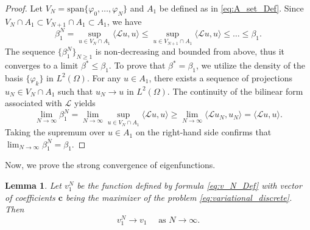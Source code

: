 \documentclass[12pt, a4paper]{article}
\theoremstyle{break}
\theoremstyle{break}
\theoremstyle{break}
\theoremstyle{break}
\theoremstyle{break}
\newtheorem{lem}{Lemma}[section]
\theoremstyle{break}
\theoremstyle{break}
\theoremstyle{break}
\theoremstyle{break}
\begin{document}
\begin{proof}
    Let $V_N = \text{span}\{\varphi_0, \ldots, \varphi_N\}$ and $A_1$ be defined as in \eqref{eq:A_set_Def}. Since $V_N \cap A_1 \subset V_{N+1} \cap A_1 \subset A_1$, we have
    \begin{equation}
        \beta_1^N = \sup_{u \in V_N \cap A_1} \langle \mathcal{L} u, u \rangle \leq \sup_{u \in V_{N+1} \cap A_1} \langle \mathcal{L} u, u \rangle \leq \ldots \leq \beta_1.
    \end{equation}
    The sequence $\{\beta_1^N\}_{N \geq 1}$ is non-decreasing and bounded from above, thus it converges to a limit $\beta^* \leq \beta_1$. To prove that $\beta^* = \beta_1$, we utilize the density of the basis $\{\varphi_k\}$ in $L^2(\Omega)$. For any $u \in A_1$, there exists a sequence of projections $u_N \in V_N \cap A_1$ such that $u_N \to u$ in $L^2(\Omega)$. The continuity of the bilinear form associated with $\mathcal{L}$ yields
    \begin{equation}
        \lim_{N \to \infty} \beta_1^N = \lim_{N \to \infty} \sup_{u \in V_N \cap A_1} \langle \mathcal{L} u, u \rangle \geq \lim_{N \to \infty} \langle \mathcal{L} u_N, u_N \rangle = \langle \mathcal{L} u, u \rangle.
    \end{equation}
    Taking the supremum over $u \in A_1$ on the right-hand side confirms that $\lim_{N \to \infty} \beta_1^N = \beta_1$.
\end{proof}

Now, we prove the strong convergence of eigenfunctions.

\begin{lem}
    \label{lem:convergence_principal_eigenfunction}
    Let $v_1^N$ be the function defined by formula \eqref{eq:v_N_Def} with vector of coefficients $\mathbf{c}$ being the maximizer of the problem \eqref{eq:variational_discrete}. Then 
    \begin{equation*}
        v_1^N \rightarrow v_1 \quad \text{ as } N \rightarrow \infty.
    \end{equation*}
\end{lem}
\end{document}
